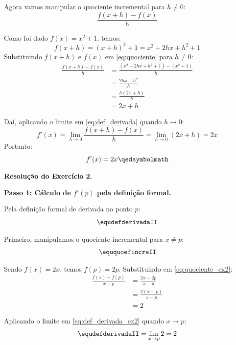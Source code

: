\begin{enumerate}[label=\alph*)]
    Agora vamos manipular o quociente incremental para $h \neq 0$:
    \begin{equation}
      \frac{f(x + h) - f(x)}{h} \label{eq:quociente}
    \end{equation}

    Como foi dado $f(x) = x^2 + 1$, temos:
    \[
    f(x + h) = (x + h)^2 + 1 = x^2 + 2hx + h^2 + 1
    \]
    Substituindo $f(x + h)$ e $f(x)$ em \eqref{eq:quociente} para $h \neq 0$:
    \begin{align*}
        \frac{f(x + h) - f(x)}{h} &= \frac{(x^2 + 2hx + h^2 + 1) - (x^2 + 1)}{h} \\[0.25cm]
        &= \frac{2hx + h^2}{h} \\[0.25cm]
        &= \frac{h(2x + h)}{h} \\[0.25cm]
        &= 2x + h
    \end{align*}

    Daí, aplicando o limite em \eqref{eq:def_derivada} quando $h \to 0$:
    \[
    f'(x) = \lim_{h \to 0} \frac{f(x + h) - f(x)}{h} = \lim_{h \to 0} (2x + h) = 2x
    \]
    Portanto:
    \[
    f'(x) = 2x \qedsymbolmath
    \]
\end{enumerate}

\vspace{0.6cm}
\noindent\textbf{Resolução do Exercício 2.}
\label{res:7.2.2}
\setcounter{equation}{0}

\textbf{Passo 1: Cálculo de $f'(p)$ pela definição formal.}

Pela definição formal de derivada no ponto $p$:
\begin{equation}
    \equdefderivadaII \label{eq:def_derivada_ex2}
\end{equation}

Primeiro, manipulamos o quociente incremental para $x \neq p$:
\begin{equation}
    \eququoefincreII  \label{eq:quociente_ex2}
\end{equation}

Sendo $f(x) = 2x$, temos $f(p) = 2p$. Substituindo em \eqref{eq:quociente_ex2}:
\begin{align*}
    \frac{f(x) - f(p)}{x - p} &= \frac{2x - 2p}{x - p} \\[0.25cm]
    &= \frac{2(x - p)}{x - p} \\[0.25cm]
    &= 2
\end{align*}

Aplicando o limite em \eqref{eq:def_derivada_ex2} quando $x \to p$:
\[
\equdefderivadaII = \lim_{x \to p} 2 = 2
\]

